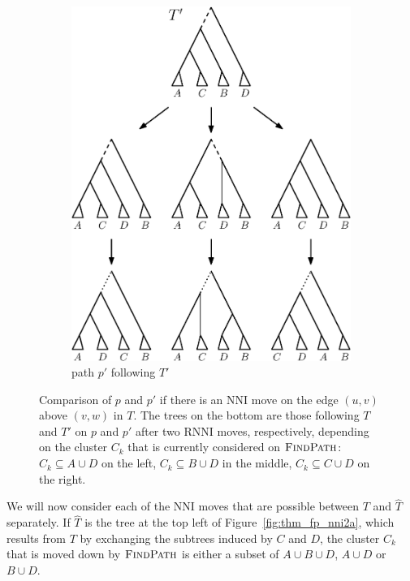 \documentclass{amsart}
\newcommand{\rnni}{\mathrm{RNNI}}
\newcommand{\findpath}{\textsc{FindPath}}
\newcommand{\nni}{\mathrm{NNI}}
\begin{document}
\begin{enumerate}
\begin{figure}[H]
\begin{subfigure}[b]{.45\textwidth}
            \includegraphics[width=0.9\linewidth]{thm_fp_nni2b.eps}
            \vspace{12pt}
            \caption{path $p'$ following $T'$}
            \label{fig:thm_fp_nni2b}
        \end{subfigure}
        \caption{Comparison of $p$ and $p'$ if there is an $\nni$ move on the edge $(u,v)$ above $(v,w)$ in $T$.
        The trees on the bottom are those following $T$ and $T'$ on $p$ and $p'$ after two $\rnni$ moves, respectively, depending on the cluster $C_k$ that is currently considered on $\findpath$:
        ${C_k \subseteq A \cup D}$ on the left, ${C_k \subseteq B \cup D}$ in the middle, ${C_k \subseteq C \cup D}$ on the right.}
    \end{figure}

    We will now consider each of the $\nni$ moves that are possible between $T$ and $\hat T$ separately.
    If $\hat T$ is the tree at the top left of Figure~\ref{fig:thm_fp_nni2a}, which results from $T$ by exchanging the subtrees induced by $C$ and $D$, the cluster $C_k$ that is moved down by $\findpath$ is either a subset of $A \cup B \cup D$, $A \cup D$ or $B \cup D$.


\end{enumerate}
\end{document}

